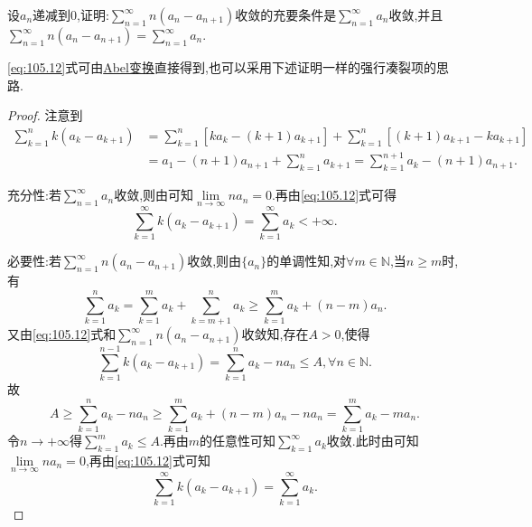 \documentclass[../../main.tex]{subfiles}%
\begin{document}
\begin{proposition}\label{proposition:级数经典命题1}
设$a_n$递减到$0$,证明:$\sum\limits_{n=1}^\infty n\left(a_n-a_{n+1}\right)$收敛的充要条件是$\sum\limits_{n=1}^\infty a_n$收敛,并且$\sum\limits_{n=1}^\infty n\left(a_n-a_{n+1}\right)=\sum\limits_{n=1}^\infty a_n$.
\end{proposition}
\begin{note}
\eqref{eq:105.12}式可由\hyperref[theorem:Abel变换]{Abel变换}直接得到,也可以采用下述证明一样的强行凑裂项的思路.
\end{note}
\begin{proof}

注意到
\begin{align}
\sum_{k=1}^n{k\left( a_k-a_{k+1} \right)}&=\sum_{k=1}^n{\left[ ka_k-\left( k+1 \right) a_{k+1} \right]}+\sum_{k=1}^n{\left[ \left( k+1 \right) a_{k+1}-ka_{k+1} \right]} \nonumber \\
&=a_1-\left( n+1 \right) a_{n+1}+\sum_{k=1}^n{a_{k+1}}=\sum_{k=1}^{n+1}{a_k}-\left( n+1 \right) a_{n+1}. \label{eq:105.12}
\end{align}

{\heiti 充分性:}若$\sum_{n=1}^{\infty}{a_n}$收敛,则由可知$\lim\limits_{n\rightarrow \infty}na_n=0$.再由\eqref{eq:105.12}式可得
$$\sum_{k=1}^{\infty}{k\left( a_k-a_{k+1} \right)}=\sum_{k=1}^{\infty}{a_k}<+\infty .$$

{\heiti 必要性:}若$\sum_{n=1}^{\infty}{n\left( a_n-a_{n+1} \right)}$收敛,则由$\{ a_n \}$的单调性知,对$\forall m\in \mathbb{N}$,当$n\geqslant m$时,有
$$\sum_{k=1}^n{a_k}=\sum_{k=1}^m{a_k}+\sum_{k=m+1}^n{a_k}\geqslant \sum_{k=1}^m{a_k}+\left( n-m \right) a_n.$$
又由\eqref{eq:105.12}式和$\sum_{n=1}^{\infty}{n\left( a_n-a_{n+1} \right)}$收敛知,存在$A>0$,使得
$$\sum_{k=1}^{n-1}{k\left( a_k-a_{k+1} \right)}=\sum_{k=1}^n{a_k}-na_n\leqslant A,\forall n\in \mathbb{N} .$$
故
$$A\geqslant \sum_{k=1}^n{a_k}-na_n\geqslant \sum_{k=1}^m{a_k}+\left( n-m \right) a_n-na_n=\sum_{k=1}^m{a_k}-ma_n.$$
令$n\rightarrow +\infty$得$\sum_{k=1}^m{a_k}\leqslant A$.再由$m$的任意性可知$\sum_{k=1}^{\infty}{a_k}$收敛.此时由可知$\lim\limits_{n\rightarrow \infty}na_n=0$,再由\eqref{eq:105.12}式可知
$$\sum_{k=1}^{\infty}{k\left( a_k-a_{k+1} \right)}=\sum_{k=1}^{\infty}{a_k}.$$

\end{proof}
\end{document}
